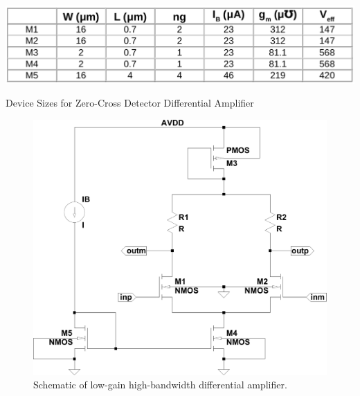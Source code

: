 \documentclass[12pt,oneside,final]{siuethesis}
\theoremstyle{definition}
\begin{document}
\begin{table}[htbp!]
 \centering
 \includegraphics[scale=.35,keepaspectratio=true]{./ch3_figures/zc_sizes.png}
 \caption{Device Sizes for Zero-Cross Detector Differential Amplifier}
 \label{tab:zcdiffamp}
\end{table}

\begin{figure}[htbp!]
	\centering
 	\includegraphics[scale=0.5,keepaspectratio=true]{../Design_Reports/CFD_circuit_report/images/zc_dm_amp.pdf}
 	\caption{Schematic of low-gain high-bandwidth differential amplifier.}
 	\label{fig:zcdiffamp}
\end{figure}
\end{document}
